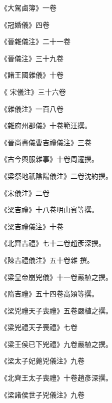 \begin{pinyinscope}
 《大駕鹵簿》一卷



 《冠婚儀》四卷



 《晉雜儀注》二十一卷



 《晉儀注》三十九卷



 《諸王國雜儀》十卷



 《
 宋儀注》三十六卷



 《雜儀注》一百八卷



 《雜府州郡儀》十卷範汪撰。



 《晉尚書儀曹吉禮儀注》三卷



 《古今輿服雜事》十卷周遷撰。



 《梁祭地祇陰陽儀注》二卷沈約撰。



 《宋儀注》二卷



 《梁吉禮》十八卷明山賓等撰。



 《梁吉禮儀注》十卷



 《北齊吉禮》七十二卷趙彥深撰。



 《陳吉禮儀注》五十卷雜
 撰。



 《梁皇帝崩兇儀》十一卷嚴植之撰。



 《隋吉禮》五十四卷高熲等撰。



 《梁兇禮天子喪禮》五卷嚴植之撰。



 《梁兇禮天子喪禮》七卷



 《梁王侯已下兇禮》九卷嚴植之撰。



 《梁太子妃薨兇儀注》九卷



 《北齊王太子喪禮》十卷趙彥深撰。



 《梁諸侯世子兇儀注》九卷




\end{pinyinscope}

